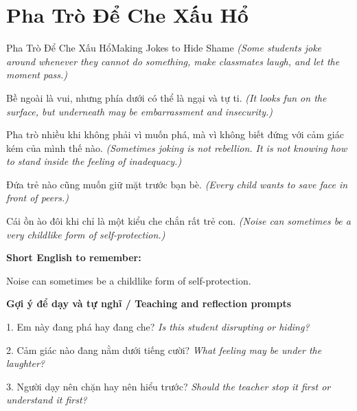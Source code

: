\section{Pha Trò Để Che Xấu Hổ}
\begin{truyen}{Pha Trò Để Che Xấu Hổ}{Making Jokes to Hide Shame}
\textit{(Some students joke around whenever they cannot do something, make classmates laugh, and let the moment pass.)}

Bề ngoài là vui, nhưng phía dưới có thể là ngại và tự ti.
\textit{(It looks fun on the surface, but underneath may be embarrassment and insecurity.)}

Pha trò nhiều khi không phải vì muốn phá, mà vì không biết đứng với cảm giác kém của mình thế nào.
\textit{(Sometimes joking is not rebellion. It is not knowing how to stand inside the feeling of inadequacy.)}

Đứa trẻ nào cũng muốn giữ mặt trước bạn bè.
\textit{(Every child wants to save face in front of peers.)}

\end{truyen}

\begin{baihoc}
Cái ồn ào đôi khi chỉ là một kiểu che chắn rất trẻ con.
\textit{(Noise can sometimes be a very childlike form of self-protection.)}
\end{baihoc}

\begin{ghinhoanh}
\textbf{Short English to remember:}

Noise can sometimes be a childlike form of self-protection.

\end{ghinhoanh}

\begin{tuhocnhanh}
\textbf{Gợi ý để dạy và tự nghĩ / Teaching and reflection prompts}

1. Em này đang phá hay đang che? \textit{Is this student disrupting or hiding?}

2. Cảm giác nào đang nằm dưới tiếng cười? \textit{What feeling may be under the laughter?}

3. Người dạy nên chặn hay nên hiểu trước? \textit{Should the teacher stop it first or understand it first?}
\end{tuhocnhanh}
\ngancach

